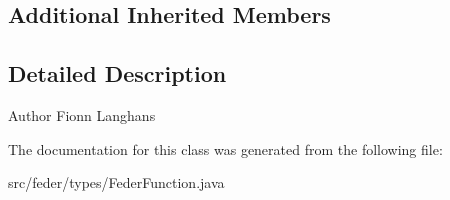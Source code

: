 \subsection*{Additional Inherited Members}


\subsection{Detailed Description}
\begin{DoxyAuthor}{Author}
Fionn Langhans 
\end{DoxyAuthor}


The documentation for this class was generated from the following file\+:\begin{DoxyCompactItemize}
\item 
src/feder/types/Feder\+Function.\+java\end{DoxyCompactItemize}
